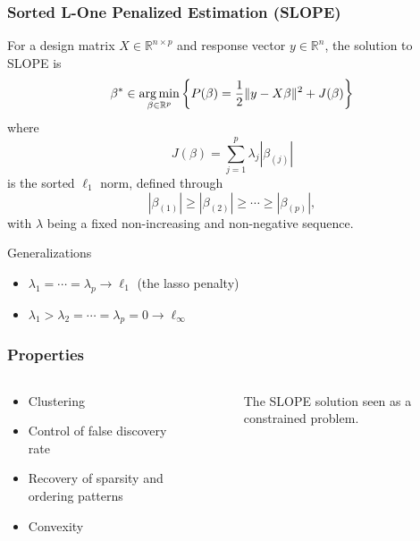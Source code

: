 \begin{frame}
  \frametitle{Sorted L-One Penalized Estimation (SLOPE)}

  For a design matrix \(X \in \mathbb{R}^{n \times p}\) and response vector \(y \in
  \mathbb{R}^n\), the solution to SLOPE is
  \[
    \beta^* \in \operatorname*{arg\,min}_{\beta \in \mathbb{R}^p}
    \left\{P(\beta) =  \frac{1}{2} \lVert {y - X \beta} \rVert^2 + J(\beta)\right\}
  \]
  where
  \begin{equation*}
    \label{eq:sorted-l1-norm}
    J(\beta) = \sum_{j=1}^p \lambda_j|\beta_{(j)}|
  \end{equation*}
  is the \alert{sorted \(\ell_1\) norm}, defined through
  \begin{equation}
    |\beta_{(1)}| \geq |\beta_{(2)}| \geq \cdots \geq |\beta_{(p)}|,
  \end{equation}
  with \(\lambda\) being a fixed non-increasing and non-negative sequence.

  \pause

  \begin{block}{Generalizations}
    \begin{itemize}
      \item \(\lambda_1 = \cdots = \lambda_p \rightarrow \ell_1\) (the lasso penalty)
      \item \(\lambda_1 > \lambda_2 = \cdots = \lambda_p = 0 \rightarrow \ell_\infty\)
    \end{itemize}
  \end{block}

\end{frame}

\begin{frame}[c]
  \frametitle{Properties}

  \begin{columns}
    \begin{column}{0.45\textwidth}
      \begin{itemize}
        \item \alert{Clustering}~\parencite{bogdan2022,schneider2020a,figueiredo2016}
        \item \alert{Control of false discovery rate}~\parencite{bogdan2013,bogdan2015}
        \item \alert{Recovery of sparsity and ordering patterns}~\parencite{bogdan2022}
        \item \alert{Convexity}
      \end{itemize}

    \end{column}
    \begin{column}{0.45\textwidth}
      \begin{figure}
        \centering
        \pgfplotsset{width=6cm,height=6cm}
        
        \caption{%
          The SLOPE solution seen as a constrained problem.
        }
        \label{fig:slope-solution}
      \end{figure}

    \end{column}
  \end{columns}

\end{frame}

